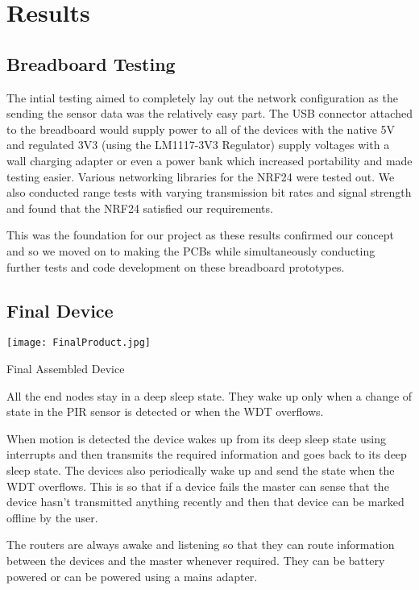 \chapter{Results}

\section{Breadboard Testing}

The intial testing aimed to completely lay out the network configuration as the sending the sensor data was the relatively easy part. The USB connector attached to the breadboard would supply power to all of the devices with the native 5V and regulated 3V3 (using the LM1117-3V3 Regulator) supply voltages with a wall charging adapter or even a power bank which increased portability and made testing easier. Various networking libraries for the NRF24 were tested out. We also conducted range tests with varying transmission bit rates and signal strength and found that the NRF24 satisfied our requirements.

This was the foundation for our project as these results confirmed our concept and so we moved on to making the PCBs while simultaneously conducting further tests and code development on these breadboard prototypes. 

\section{Final Device}

\begin{center}
		
		\texttt{[image: FinalProduct.jpg]}
		
		Final Assembled Device

\end{center}


All the end nodes stay in a deep sleep state. They wake up only when a change of state in the PIR sensor is detected or when the WDT overflows. 

When motion is detected the device wakes up from its deep sleep state using interrupts and then transmits the required information and goes back to its deep sleep state. 
The devices also periodically wake up and send the state when the WDT overflows. This is so that if a device fails the master can sense that the device hasn't transmitted anything recently and then that device can be marked offline by the user.

The routers are always awake and listening so that they can route information between the devices and the master whenever required. They can be battery powered or can be powered using a mains adapter.

